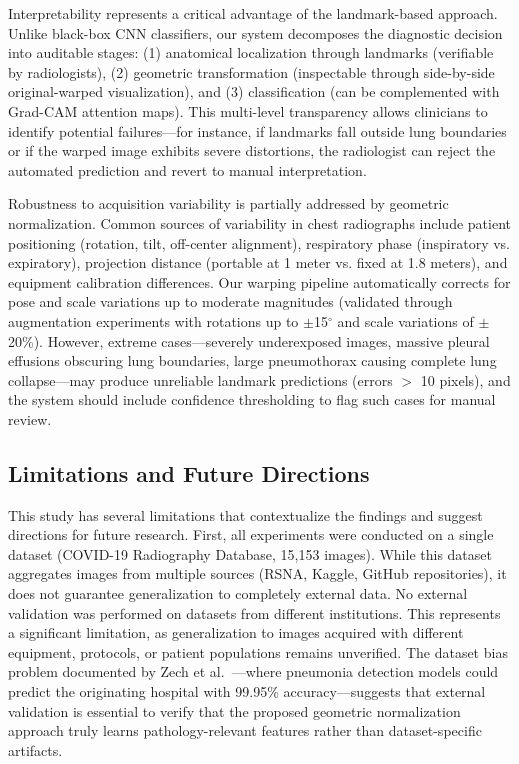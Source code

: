 \documentclass[applsci,article,submit,pdftex,moreauthors]{Definitions/mdpi}
\begin{document}
Interpretability represents a critical advantage of the landmark-based approach. Unlike black-box CNN classifiers, our system decomposes the diagnostic decision into auditable stages: (1) anatomical localization through landmarks (verifiable by radiologists), (2) geometric transformation (inspectable through side-by-side original-warped visualization), and (3) classification (can be complemented with Grad-CAM attention maps). This multi-level transparency allows clinicians to identify potential failures---for instance, if landmarks fall outside lung boundaries or if the warped image exhibits severe distortions, the radiologist can reject the automated prediction and revert to manual interpretation.

Robustness to acquisition variability is partially addressed by geometric normalization. Common sources of variability in chest radiographs include patient positioning (rotation, tilt, off-center alignment), respiratory phase (inspiratory vs. expiratory), projection distance (portable at 1 meter vs. fixed at 1.8 meters), and equipment calibration differences. Our warping pipeline automatically corrects for pose and scale variations up to moderate magnitudes (validated through augmentation experiments with rotations up to $\pm$15$^{\circ}$ and scale variations of $\pm$20\%). However, extreme cases---severely underexposed images, massive pleural effusions obscuring lung boundaries, large pneumothorax causing complete lung collapse---may produce unreliable landmark predictions (errors $>$ 10 pixels), and the system should include confidence thresholding to flag such cases for manual review.

\subsection{Limitations and Future Directions}

This study has several limitations that contextualize the findings and suggest directions for future research. First, all experiments were conducted on a single dataset (COVID-19 Radiography Database, 15,153 images). While this dataset aggregates images from multiple sources (RSNA, Kaggle, GitHub repositories), it does not guarantee generalization to completely external data. No external validation was performed on datasets from different institutions. This represents a significant limitation, as generalization to images acquired with different equipment, protocols, or patient populations remains unverified. The dataset bias problem documented by Zech et al.~\cite{zech2018variable}---where pneumonia detection models could predict the originating hospital with 99.95\% accuracy---suggests that external validation is essential to verify that the proposed geometric normalization approach truly learns pathology-relevant features rather than dataset-specific artifacts.
\end{document}
